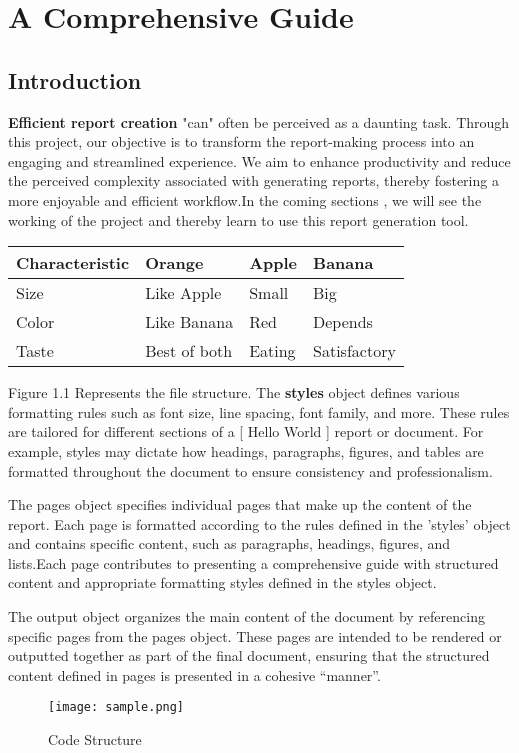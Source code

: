 \documentclass[oneside]{book}
\newcommand{\square}[1]{[ #1 ]}
\newcommand{\quotes}[1]{"#1"}
\begin{document}
\setcounter{page}{0}
\tableofcontents
\newpage\listoffigures
\clearpage
{}
\setcounter{page}{1}
\newpage
\chapter{A Comprehensive Guide}
\section{Introduction}
\textbf{Efficient report creation} \quotes{can} often be perceived as a daunting task. Through this project, our objective is to transform the report-making process
             into an engaging and streamlined experience. We aim to enhance productivity and reduce the perceived complexity associated with generating reports,
             thereby fostering a more enjoyable and efficient workflow.In the coming sections , we will see the working of the project and thereby learn to use this
              report generation tool.\par
\begin{table}[h!]
\centering
\begin{tabularx}{\textwidth}{| X | X | X | X |}
\hline
\textbf{Characteristic} & \textbf{Orange} & \textbf{Apple} & \textbf{Banana} \\ \hline
Size & Like Apple & Small & Big \\ \hline
Color & Like Banana & Red & Depends \\ \hline
Taste & Best of both & Eating & Satisfactory \\ \hline
\end{tabularx}
\label{table:1}
\end{table}
Figure 1.1 Represents the file structure.
            The \textbf{styles} object defines various formatting rules such as font size, line spacing, font family, and more. These rules are tailored for different 
            sections of a \square{Hello World} report or document. For example, styles may dictate how headings, paragraphs, figures, and tables are formatted throughout the document 
            to ensure consistency and professionalism.\par
The pages object specifies individual pages that make up the content of the report. Each page is formatted according to the 
            rules defined in the 'styles' object and contains specific content, such as paragraphs, headings, figures, and lists.Each page contributes to presenting a 
            comprehensive guide with structured content and appropriate formatting styles defined in the styles object.\par
The output object organizes the main content of the document by referencing specific pages from the pages object.
            These pages are intended to be rendered or outputted together as part of the final document, ensuring that the structured content defined in pages is 
            presented in a cohesive ``manner''.\par
\begin{figure}[h]
\centering
\texttt{[image: sample.png]}
\caption{Code Structure}
\end{figure}
\end{document}
